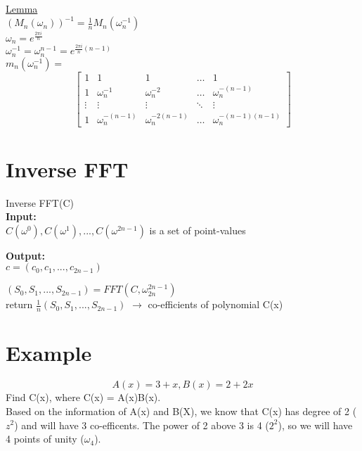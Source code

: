 \documentclass[11pt]{article}
\begin{document}
\begin{enumerate}
    \begin{center}
    \underline{Lemma} \\[10pt]
    $(M_n(\omega_n))^{-1}=\frac{1}{n}M_n(\omega_n^{-1})$ \\[10pt]
    $\omega_n=e^{\frac{2\pi{}i}{n}}$ \\
    $\omega_n^{-1}=\omega_n^{n-1}=e^{\frac{2\pi{}i}{n}(n-1)}$ \\[10pt]
    $m_n(\omega_n^{-1})=$
\[
\begin{bmatrix}
    1 & 1 & 1 & \dots & 1 \\
    1 & \omega_n^{-1} & \omega_n^{-2} & \dots & \omega_n^{-(n-1)} \\
    \vdots & \vdots & \vdots & \ddots & \vdots \\
    1 & \omega_n^{-(n-1)} & \omega_n^{-2(n-1)} & \dots & \omega_n^{-(n-1)(n-1)}
\end{bmatrix}
\]
\end{center}
\end{enumerate}

\section{Inverse FFT}
\noindent
Inverse FFT(C)\\
\textbf{Input:} \\
 \(C(\omega^0), C(\omega^1), ..., C(\omega^{2n-1})\) is a set of point-values \\

\vspace{10pt}

\noindent
\textbf{Output:} \\
\(c = (c_0, c_1, ..., c_{2n-1})\)\\

\vspace{10pt}

\noindent
\((S_0, S_1, ..., S_{2n-1}) = FFT(C, \omega_{2n}^{2n-1})\)\\
return \(\frac{1}{n}(S_0, S_1, ..., S_{2n-1})\) \(\rightarrow{}\) co-efficients of polynomial C(x)\\

\section{Example}


\[A(x) = 3 + x, B(x) = 2 + 2x\]
\noindent
Find C(x), where C(x) = A(x)B(x).\\
Based on the information of A(x) and B(X), we know that C(x) has degree of 2 (\(z^2\)) and will have 3 co-efficents. The power of 2 above 3 is 4 (\(2^2\)), so we will have 4 points of unity (\(\omega_4\)).\\
\vspace{10pt}
\end{document}
